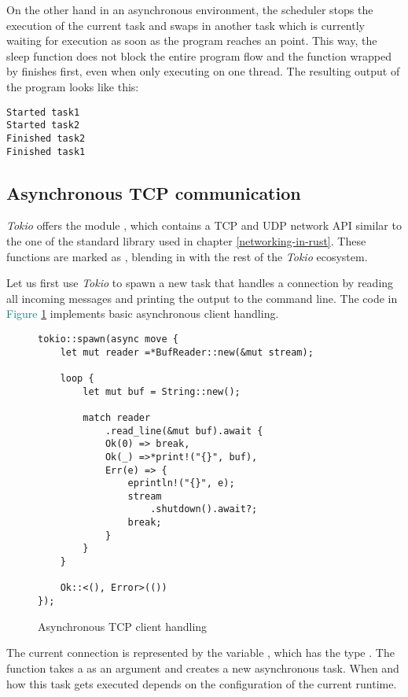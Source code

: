 On the other hand in an asynchronous environment, the scheduler stops the execution of the current task and swaps in
another task which is currently waiting for execution as soon as the program reaches an  point. This way,
the sleep function does not block the entire program flow and the function wrapped by  finishes first,
even when only executing on one thread. The resulting output of the program looks like this:

\begin{verbatim}
Started task1
Started task2
Finished task2
Finished task1
\end{verbatim}

\subsection{Asynchronous TCP communication}
\textit{Tokio} offers the module , which contains a TCP and UDP network API similar to the one of the
standard library used in chapter \ref{networking-in-rust}. These functions are marked as , blending in with
the rest of the \textit{Tokio} ecosystem.

Let us first use \textit{Tokio} to spawn a new task that handles a connection by reading all incoming messages and
printing the output to the command line. The code in \textcolor{teal}{Figure \ref{async-tcp-client-handling}}
implements basic asynchronous client handling.

\begin{figure}[ht]
    \begin{verbatim}
tokio::spawn(async move {
    let mut reader =*BufReader::new(&mut stream);

    loop {
        let mut buf = String::new();

        match reader
            .read_line(&mut buf).await {
            Ok(0) => break,
            Ok(_) =>*print!("{}", buf),
            Err(e) => {
                eprintln!("{}", e);
                stream
                    .shutdown().await?;
                break;
            }
        }
    }

    Ok::<(), Error>(())
});
    \end{verbatim}
    \caption{Asynchronous TCP client handling}
    \label{async-tcp-client-handling}
\end{figure}

The current connection is represented by the variable , which has the type .
The function  takes a  as an argument and creates a new asynchronous task. When and how
this task gets executed depends on the configuration of the current runtime.

